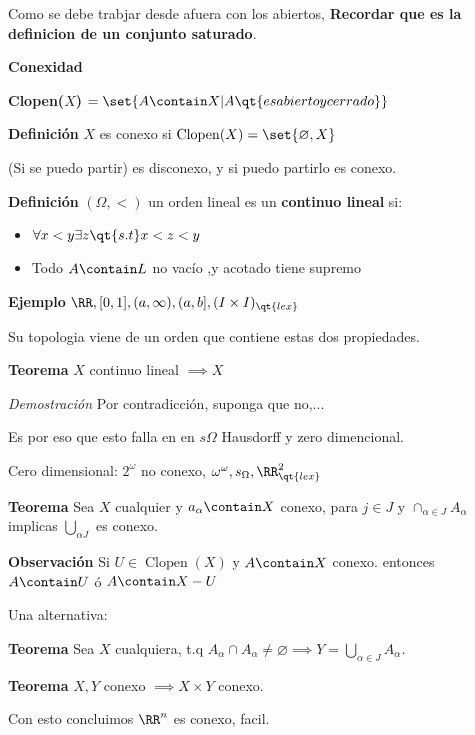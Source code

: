 
Como se debe trabjar desde afuera con los abiertos, \textbf{Recordar que es la definicion de un conjunto saturado}.

\textbf{\LARGE Conexidad}

\begin{define}
	\textbf{Clopen($X$)} $ = \set{A \contain X | A \qt{ es abierto y cerrado}} $ 
\end{define}

\textbf{Definición} $ X $ es conexo si $ \operatorname{Clopen}(X) = \set{\varnothing,X} $

(Si se puedo partir) es disconexo, y si puedo partirlo es conexo.
 
\textbf{Definición} $ (\Omega, <) $ un orden lineal es un \textbf{continuo lineal } si:
\begin{itemize}
	\item $ \forall x<y \exists z \qt{s.t} x <z <y $
	\item Todo $ A \contain L $ no vacío ,y acotado tiene supremo
\end{itemize}

\textbf{Ejemplo} $ \RR, [0,1], (a, \infty), (a,b], (I \times I)_{\qt{lex}} $

Su topologia viene de un orden que contiene estas dos propiedades.

\textbf{Teorema} $X$ continuo lineal $  \implies X $ 

\textit{Demostración} Por contradicción, suponga que no,... \qedsymbol

Es por eso que esto falla en en $ s\Omega $ Hausdorff y zero dimencional.

Cero dimensional: $ 2^\omega $ no conexo, $ \omega^\omega, s_{\Omega}, \RR^2_{\qt{lex}}  $

\textbf{Teorema} Sea $X$ cualquier y $ a_{\alpha} \contain X$ conexo, para $ j \in J$ y $ \cap _{\alpha \in J}A_{\alpha} $ implicas $ \bigcup_{\alpha  J} $ es conexo.

\textbf{Observación} Si $ U \in \operatorname{Clopen}(X) $ y $A \contain X  $ conexo. entonces $  A \contain U $ ó $ A \contain X - U $

Una alternativa:

\textbf{Teorema } Sea $ X $ cualquiera, t.q $ A_{\alpha} \cap A_{\alpha} \neq \varnothing \implies Y = \bigcup_{\alpha \in J}A_\alpha $.

\textbf{Teorema} $ X,Y  $ conexo $ \implies X \times Y $ conexo.

Con esto concluimos $ \RR^n $ es conexo, facil.

